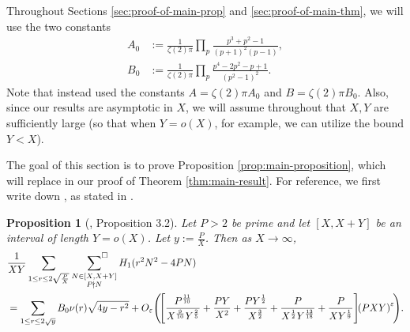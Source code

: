 \documentclass[12pt,letterpaper,reqno]{amsart}
\theoremstyle{plain}
\newtheorem*{unnumberedproposition}{Proposition}
\theoremstyle{definition}
\numberwithin{equation}{section}
\numberwithin{figure}{section}
\numberwithin{table}{section}
\newcommand{\lrp}[1]{\!\left(#1\right)}
\newcommand{\lrb}[1]{\!\left[#1\right]}
\begin{document}
Throughout Sections \ref{sec:proof-of-main-prop} and \ref{sec:proof-of-main-thm}, we will use the two constants
\begin{align}
    A_0 &:= \frac{1}{\zeta(2)\pi} \prod_{p}\frac{p^3+p^2-1}{(p+1)^2(p-1)}, 
    \label{eqn:def-A0}
    \\
    B_0 &:= \frac{1}{\zeta(2)\pi} \prod_{p} \frac{p^4-2p^2-p+1}{(p^2-1)^2}.
\end{align}
Note that \cite{Zubrilina} instead used the constants $A = \zeta(2)\pi A_0$ and $B = \zeta(2)\pi B_0$.
Also, since our results are asymptotic in $X$, we will assume throughout that $X,Y$ are sufficiently large (so that when $Y = o(X)$, for example, we can utilize the bound $Y < X$).

The goal of this section is to prove Proposition \ref{prop:main-proposition}, which will replace \cite[Proposition 3.2]{Zubrilina} in our proof of Theorem \ref{thm:main-result}. For reference, we first write down \cite[Proposition 3.2]{Zubrilina}, as stated in \cite{Zubrilina}.

\begin{unnumberedproposition}[\cite{Zubrilina}, Proposition 3.2]
Let $P>2$ be prime and let $[X,X+Y]$ be an interval of length $Y=o(X)$. Let $y:= \frac{P}{X}$. Then as $X\to\infty$,
\begin{align}
       &\frac{1}{XY} 
       \sum_{1\leq r \leq 2\sqrt{\frac{P}{X}}}
       \hspace{2mm}
       \sideset{}{^\square}\sum_{\substack{N\in[X,X+Y] \\ P\nmid N}}
        H_1(r^2N^2-4PN)   \\
        &= \sum_{1\leq r\leq 2\sqrt{y}}B_0\nu(r)\sqrt{4y-r^2} +O_\varepsilon
        \lrp{
        \lrb{
            \frac{P^{\frac{11}{10}}}{X^{\frac{9}{10}}Y^{\frac{2}{5}}}
            +\frac{PY}{X^2} 
            +\frac{PY^{\frac{1}{2}}}{X^{\frac{3}{2}}}
            +\frac{P}{X^{\frac{1}{2}}Y^{\frac{13}{18}}}
            +\frac{P}{XY^{\frac{1}{9}}}
        }
        \!\lrp{PXY}^\varepsilon
        \!}\!.
\end{align}
\end{unnumberedproposition}
\end{document}
